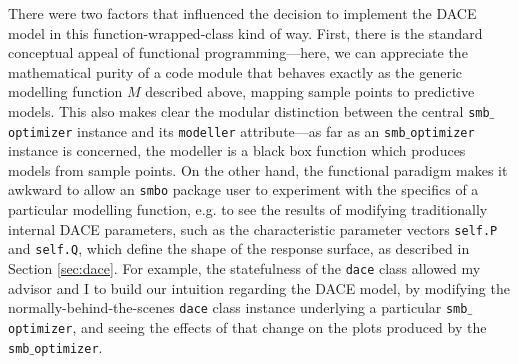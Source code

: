 There were two factors that influenced the decision to implement the DACE model in this function-wrapped-class kind of way. First, there is the standard conceptual appeal of functional programming---here, we can appreciate the mathematical purity of a code module that behaves exactly as the generic modelling function $M$ described above, mapping sample points to predictive models. This also makes clear the modular distinction between the central \texttt{smb$\_$optimizer} instance and its \texttt{modeller} attribute---as far as an \texttt{smb$\_$optimizer} instance is concerned, the modeller is a black box function which produces models from sample points. On the other hand, the functional paradigm makes it awkward to allow an \texttt{smbo} package user to experiment with the specifics of a particular modelling function, e.g. to see the results of modifying traditionally internal DACE parameters, such as the characteristic parameter vectors \texttt{self.P} and \texttt{self.Q}, which define the shape of the response surface, as described in Section \ref{sec:dace}. For example, the statefulness of the \texttt{dace} class allowed my advisor and I to build our intuition regarding the DACE model, by modifying the normally-behind-the-scenes \texttt{dace} class instance underlying a particular \texttt{smb$\_$optimizer}, and seeing the effects of that change on the plots produced by the \texttt{smb$\_$optimizer}.






